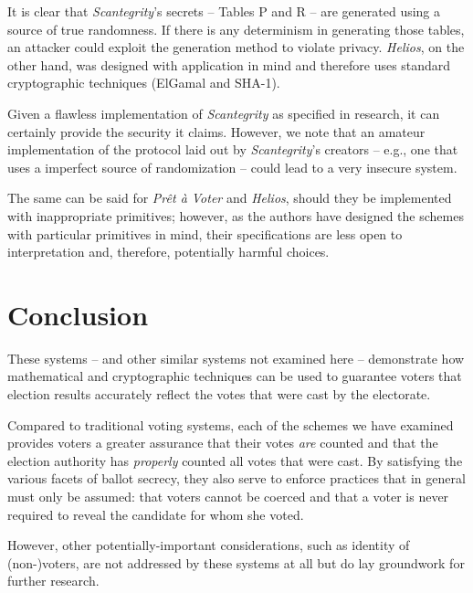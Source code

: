 \documentclass[10pt,twocolumn]{article}
\newcommand{\term}[1]{\textit{#1}}
\newcommand{\preta}{Pr\^{e}t \`{a}}
\newcommand{\pv}{\preta{} Voter}
\begin{document}
It is clear that \term{Scantegrity}'s secrets -- Tables P and R -- are generated using a source of true
randomness. If there is any determinism in generating those tables, an attacker could exploit the
generation method to violate privacy. \term{Helios}, on the other hand, was designed with application in
mind and therefore uses standard cryptographic techniques (ElGamal and SHA-1).

Given a flawless implementation of \term{Scantegrity} as specified in research, it can certainly provide the
security it claims. However, we note that an amateur implementation of the protocol laid out by
\term{Scantegrity}'s creators -- e.g., one that uses a imperfect source of randomization -- could lead to a
very insecure system.

The same can be said for \term{\pv{}} and \term{Helios}, should they be implemented with inappropriate primitives; however, as the authors have designed the schemes with particular primitives in mind, their
specifications are less open to interpretation and, therefore, potentially harmful choices.

\section{Conclusion}

These systems -- and other similar systems not examined here -- demonstrate how mathematical and
cryptographic techniques can be used to guarantee voters that election results accurately reflect
the votes that were cast by the electorate.

Compared to traditional voting systems, each of the schemes we have examined provides voters a
greater assurance that their votes \emph{are} counted and that the election authority has
\emph{properly} counted all votes that were cast. By satisfying the various facets of ballot
secrecy, they also serve to enforce practices that in general must only be assumed: that voters
cannot be coerced and that a voter is never required to reveal the candidate for whom she voted.

However, other potentially-important considerations, such as identity of (non-)voters, are not
addressed by these systems at all but do lay groundwork for further research.



\end{document}

